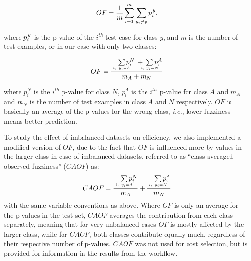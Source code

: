 \documentclass[10pt,article]{memoir}
\begin{document}
\begin{equation}
OF =\frac{ 1}{m} \sum\limits_{i=1}^{m} \sum\limits_{y_i \neq y }  p_i^{\kern1pt y},		
\end{equation}

where $p_i^{\kern1pt y}$ is the p-value of the $i^{th}$ test case for class $y$, and $m$ is the number of test examples, or in our case with only two classes:

\begin{equation}
OF =  \frac
        {\quad\sum\limits_{\mathclap{\substack{\scriptscriptstyle i,\ y_i=A}}}p_i^N \, + \;\sum\limits_{\mathclap{\substack{\scriptscriptstyle i,\ y_i=N}}}p_i^A}
        {m_A + m_N}
\end{equation}

where $p_i^N$ is the $i^{th}$ p-value for class $N$, $p_i^A$ is the $i^{th}$
p-value for class $A$ and $m_A$ and $m_N$ is the number of test examples in
class $A$ and $N$ respectively. $OF$ is basically an average of the p-values for
the wrong class, \textit{i.e.}, lower fuzziness means better prediction.

To study the effect of imbalanced datasets on efficiency, we also implemented a
modified version of $OF$, due to the fact that $OF$ is influenced more
by values in the larger class in case of imbalanced datasets, referred to as
``class-averaged
observed fuzziness'' ($CAOF$) as:
\begin{equation}
CAOF = \frac
        {\quad\sum\limits_{\mathclap{\substack{\scriptscriptstyle i,\ y_i=A}}}p_i^N}
        {m_A}
       + \frac
        {\quad\sum\limits_{\mathclap{\substack{\scriptscriptstyle i,\ y_i=N}}}p_i^A}
        {m_N}
\end{equation}
with the same variable conventions as above. Where $OF$ is only an average for
the p-values in the test set, $CAOF$ averages the contribution from each class
separately, meaning that for very unbalanced cases $OF$ is mostly affected by
the larger class, while for $CAOF$, both classes contribute equally much,
regardless of their respective number of p-values.
%
%
%
$CAOF$ was not used for cost selection, but is provided for information in the
results from the workflow.
\end{document}

